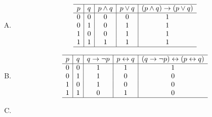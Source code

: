{{\begin{practices}
\begin{enumerate}[A.]
{\begin{table}[H]
\[\begin{array}{c|c|c|c}
                                1 & 1 & 1 & 0 \\
                                \hline
                            \end{array}
                        \]
                    \end{table}
                }
                \item
                {
                    \begin{table}[H]
                        \[
                            \begin{array}{c|c|c|c|c}
                                \hline
                                p & q & p \wedge q & p \vee q & (p \wedge q) \rightarrow (p \vee q) \\
                                \hline
                                0 & 0 & 0 & 0 & 1 \\
                                0 & 1 & 0 & 1 & 1 \\
                                1 & 0 & 0 & 1 & 1 \\
                                1 & 1 & 1 & 1 & 1 \\
                                \hline
                            \end{array}
                        \]
                    \end{table}
                }
                \item
                {
                    \begin{table}[H]
                        \[
                            \begin{array}{c|c|c|c|c}
                                \hline
                                p & q & q \rightarrow \neg p & p \leftrightarrow q & (q \rightarrow \neg p) \leftrightarrow (p \leftrightarrow q) \\
                                \hline
                                0 & 0 & 1 & 1 & 1 \\
                                0 & 1 & 1 & 0 & 0 \\
                                1 & 0 & 1 & 0 & 0 \\
                                1 & 1 & 0 & 1 & 0 \\
                                \hline
                            \end{array}
                        \]
                    \end{table}
                }
                \item

\end{enumerate}
\end{practices}}}
